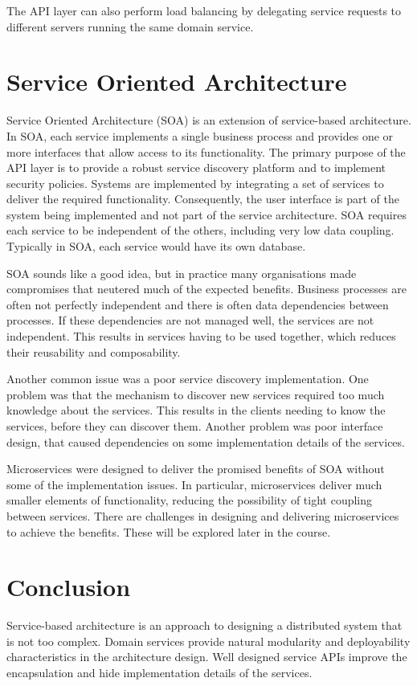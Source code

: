 The API layer can also perform load balancing by delegating service requests to different servers running the same domain service.


\section{Service Oriented Architecture}

Service Oriented Architecture (SOA) is an extension of service-based architecture.
In SOA, each service implements a single business process and provides one or more interfaces that allow access to its functionality.
The primary purpose of the API layer is to provide a robust service discovery platform and to implement security policies.
Systems are implemented by integrating a set of services to deliver the required functionality.
Consequently, the user interface is part of the system being implemented and not part of the service architecture.
SOA requires each service to be independent of the others, including very low data coupling.
Typically in SOA, each service would have its own database.

SOA sounds like a good idea, but in practice many organisations made compromises that neutered much of the expected benefits.
Business processes are often not perfectly independent and there is often data dependencies between processes.
If these dependencies are not managed well, the services are not independent.
This results in services having to be used together, which reduces their reusability and composability.

Another common issue was a poor service discovery implementation.
One problem was that the mechanism to discover new services required too much knowledge about the services.
This results in the clients needing to know the services, before they can discover them.
Another problem was poor interface design, that caused dependencies on some implementation details of the services.

Microservices were designed to deliver the promised benefits of SOA without some of the implementation issues.
In particular, microservices deliver much smaller elements of functionality, reducing the possibility of tight coupling between services.
There are challenges in designing and delivering microservices to achieve the benefits.
These will be explored later in the course.


\section{Conclusion}

Service-based architecture is an approach to designing a distributed system that is not too complex.
Domain services provide natural modularity and deployability characteristics in the architecture design.
Well designed service APIs improve the encapsulation and hide implementation details of the services.
